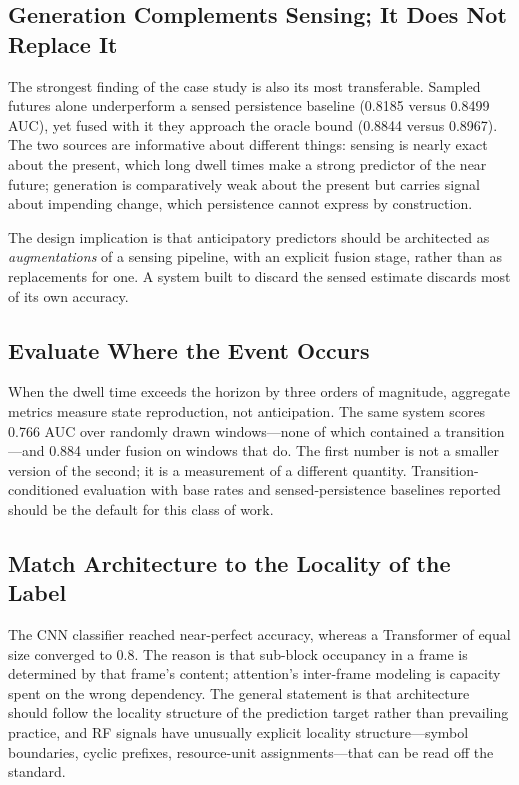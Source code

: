 \documentclass[lettersize,journal]{IEEEtran}
\begin{document}
\subsection{\textbf{Generation Complements Sensing; It Does Not Replace It}}
The strongest finding of the case study is also its most transferable.
Sampled futures alone underperform a sensed persistence baseline
(0.8185 versus 0.8499 AUC), yet fused with it they approach the oracle
bound (0.8844 versus 0.8967). The two sources are informative about
different things: sensing is nearly exact about the present, which
long dwell times make a strong predictor of the near future; generation
is comparatively weak about the present but carries signal about
impending change, which persistence cannot express by construction.

The design implication is that anticipatory predictors should be
architected as \emph{augmentations} of a sensing pipeline, with an
explicit fusion stage, rather than as replacements for one. A system
built to discard the sensed estimate discards most of its own accuracy.

\subsection{\textbf{Evaluate Where the Event Occurs}}
When the dwell time exceeds the horizon by three orders of magnitude,
aggregate metrics measure state reproduction, not anticipation. The
same system scores 0.766 AUC over randomly drawn windows---none of which
contained a transition---and 0.884 under fusion on windows that do. The
first number is not a smaller version of the second; it is a
measurement of a different quantity. Transition-conditioned evaluation
with base rates and sensed-persistence baselines reported should be the
default for this class of work.

\subsection{\textbf{Match Architecture to the Locality of the Label}}
The CNN classifier reached near-perfect accuracy, whereas a Transformer of
equal size converged to 0.8. The reason is that sub-block occupancy in a
frame is determined by that frame's content; attention's inter-frame
modeling is capacity spent on the wrong dependency. The general
statement is that architecture should follow the locality structure of
the prediction target rather than prevailing practice, and RF signals
have unusually explicit locality structure---symbol boundaries, cyclic
prefixes, resource-unit assignments---that can be read off the standard.
\end{document}
